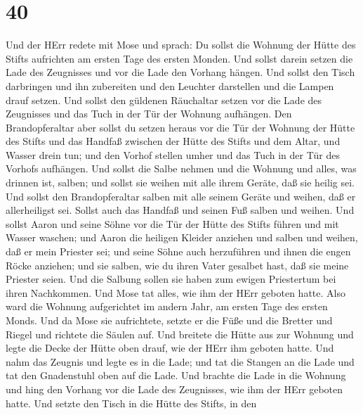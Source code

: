 \hypertarget{section-39}{%
\section{40}\label{section-39}}

 Und der HErr redete mit Mose und sprach:  Du
sollst die Wohnung der Hütte des Stifts aufrichten am ersten Tage des
ersten Monden.  Und sollst darein setzen die Lade des
Zeugnisses und vor die Lade den Vorhang hängen.  Und sollst
den Tisch darbringen und ihn zubereiten und den Leuchter darstellen und
die Lampen drauf setzen.  Und sollst den güldenen Räuchaltar
setzen vor die Lade des Zeugnisses und das Tuch in der Tür der Wohnung
aufhängen.  Den Brandopferaltar aber sollst du setzen heraus
vor die Tür der Wohnung der Hütte des Stifts  und das
Handfaß zwischen der Hütte des Stifts und dem Altar, und Wasser drein
tun;  und den Vorhof stellen umher und das Tuch in der Tür
des Vorhofs aufhängen.  Und sollst die Salbe nehmen und die
Wohnung und alles, was drinnen ist, salben; und sollst sie weihen mit
alle ihrem Geräte, daß sie heilig sei.  Und sollst den
Brandopferaltar salben mit alle seinem Geräte und weihen, daß er
allerheiligst sei.  Sollst auch das Handfaß und seinen Fuß
salben und weihen.  Und sollst Aaron und seine Söhne vor
die Tür der Hütte des Stifts führen und mit Wasser waschen;
 und Aaron die heiligen Kleider anziehen und salben und
weihen, daß er mein Priester sei;  und seine Söhne auch
herzuführen und ihnen die engen Röcke anziehen;  und sie
salben, wie du ihren Vater gesalbet hast, daß sie meine Priester seien.
Und die Salbung sollen sie haben zum ewigen Priestertum bei ihren
Nachkommen.  Und Mose tat alles, wie ihm der HErr geboten
hatte.  Also ward die Wohnung aufgerichtet im andern Jahr,
am ersten Tage des ersten Monds.  Und da Mose sie
aufrichtete, setzte er die Füße und die Bretter und Riegel und richtete
die Säulen auf.  Und breitete die Hütte aus zur Wohnung und
legte die Decke der Hütte oben drauf, wie der HErr ihm geboten hatte.
 Und nahm das Zeugnis und legte es in die Lade; und tat die
Stangen an die Lade und tat den Gnadenstuhl oben auf die Lade.
 Und brachte die Lade in die Wohnung und hing den Vorhang
vor die Lade des Zeugnisses, wie ihm der HErr geboten hatte.
 Und setzte den Tisch in die Hütte des Stifts, in den

